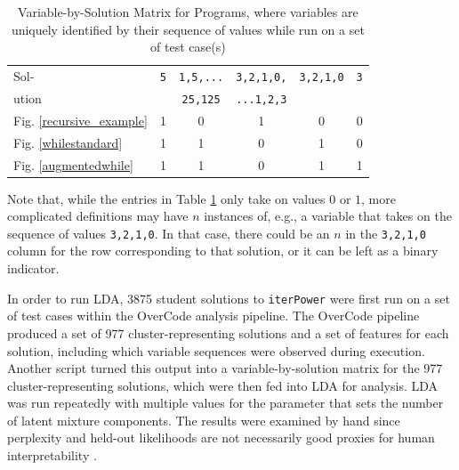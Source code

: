 \begin{table}[t]
\caption{Variable-by-Solution Matrix for Programs, where variables are uniquely identified by their sequence of values while run on a set of test case(s)}
\label{varbydocmat}
\begin{center}
\begin{small}
\begin{sc}
\begin{tabular}{| l | c | c | c | c | c |}
\hline
Sol- & \texttt{5} & \texttt{1,5,...} & \texttt{3,2,1,0,} & \texttt{3,2,1,0} & \texttt{3} \\
ution& & \texttt{25,125} & \texttt{...1,2,3} & &  \\
\hline
Fig. \ref{recursive_example} & 1 & 0 & 1 & 0 & 0 \\
Fig. \ref{whilestandard}     & 1 & 1 & 0 & 1 & 0 \\
Fig. \ref{augmentedwhile}    & 1 & 1 & 0 & 1 & 1 \\
\hline
\end{tabular}
\end{sc}
\end{small}
\end{center}
\end{table}

Note that, while the entries in Table \ref{varbydocmat} only take on values $0$ or $1$, more complicated definitions may have $n$ instances of, e.g., a variable that takes on the sequence of values \texttt{3,2,1,0}. In that case, there could be an $n$ in the \texttt{3,2,1,0} column for the row corresponding to that solution, or it can be left as a binary indicator. %


In order to run LDA, 3875 student solutions to \texttt{iterPower} were first run on a set of test cases within the OverCode analysis pipeline. The OverCode pipeline produced a set of 977 cluster-representing solutions and a set of features for each solution, including which variable sequences were observed during execution. Another script turned this output into a variable-by-solution matrix for the 977 cluster-representing solutions, which were then fed into LDA for analysis. LDA was run repeatedly with multiple values for the parameter that sets the number of latent mixture components. The results were examined by hand since perplexity and held-out likelihoods are not necessarily good proxies for human interpretability \cite{readingtealeaves}. 


